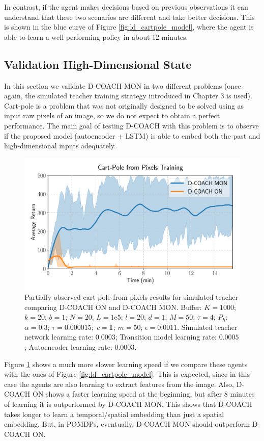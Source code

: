In contrast, if the agent makes decisions based on previous observations it can understand that these two scenarios are different and take better decisions. This is shown in the blue curve of Figure \ref{fig:ld_cartpole_model}, where the agent is able to learn a well performing policy in about 12 minutes. 

\subsection{Validation High-Dimensional State}
In this section we validate D-COACH MON in two different problems (once again, the simulated teacher training strategy introduced in Chapter 3 is used). Cart-pole is a problem that was not originally designed to be solved using as input raw pixels of an image, so we do not expect to obtain a perfect performance. The main goal of testing D-COACH with this problem is to observe if the proposed model (autoencoder + LSTM) is able to embed both the past and high-dimensional inputs adequately.

\begin{figure}[h]
    \centering
    \includegraphics[width=0.8\linewidth]{imagenes/cap3/cartpole_HD_model.pdf}
    \caption{Partially observed cart-pole from pixels results for simulated teacher comparing D-COACH ON and D-COACH MON.  Buffer: $K = 1000$; $k=20$; $b = 1$; $N = 20$; $L=1\mathrm{e}5$; $l=20$; $d=1$; $M=50$; $\tau=4$; $P_{h}$: $\alpha = 0.3$; $\tau = 0.000015$; $\emph{e}=\textbf{1}$; $m=50$; $\epsilon=0.0011$. Simulated teacher network learning rate: $0.0003$; Transition model learning rate: $0.0005$; Autoencoder learning rate: $0.0003$.}
    \label{fig:cp_hd}
\end{figure}

Figure \ref{fig:cp_hd} shows a much more slower learning speed if we compare these agents with the ones of Figure \ref{fig:ld_cartpole_model}. This is expected, since in this case the agents are also learning to extract features from the image. Also, D-COACH ON shows a faster learning speed at the beginning, but after 8 minutes of learning it is outperformed by D-COACH MON. This shows that D-COACH takes longer to learn a temporal/spatial embedding than just a spatial embedding. But, in POMDPs, eventually, D-COACH MON should outperform D-COACH ON.

